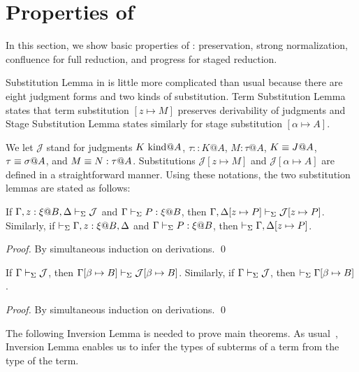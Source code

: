 
\section{Properties of \LMD \label{sec:properties}}

In this section, we show basic properties of \LMD: preservation, strong normalization, confluence for full reduction, and progress for staged reduction.


Substitution Lemma in \LMD{} is little more complicated than usual
because there are eight judgment forms and two kinds of substitution.
Term Substitution Lemma states that term substitution $[z \mapsto M]$
preserves derivability of judgments and Stage Substitution Lemma
states similarly for stage substitution $[\alpha\mapsto A]$.

We let $\mathcal{J}$ stand for judgments $K \text{\ kind} @A$, $\tau::K@A$,
$M:\tau@A$, $K \equiv J @ A$, $\tau \equiv \sigma @ A$, and
$M \equiv N : \tau @ A$.  Substitutions $\mathcal{J}[z \mapsto M]$ and
$\mathcal{J}[\alpha \mapsto A]$ are defined in a straightforward
manner.  Using these notations, the two substitution lemmas are stated as follows:

\begin{lemma}
  If $\G, z:\xi@B, \D \V \mathcal{J}$ and $\Gamma\vdash_\Sigma P:\xi @B$, then $\Gamma, \Delta[z \mapsto P] \vdash_\Sigma \mathcal{J}[z \mapsto P]$.  Similarly, if $\V \G, z:\xi@B, \D$ and
  $\Gamma\vdash_\Sigma P:\xi @B$, then $\vdash_\Sigma \Gamma, \Delta[z \mapsto P]$.
\end{lemma}

\begin{proof}
  By simultaneous induction on derivations.
 \qed
\end{proof}

\begin{lemma}
	If $\Gamma \vdash_\Sigma \mathcal{J}$, then $\Gamma[\beta\mapsto B] \vdash_\Sigma \mathcal{J}[\beta\mapsto B]$.  Similarly, if $\Gamma \vdash_\Sigma \mathcal{J}$, then $\vdash_\Sigma \Gamma[\beta\mapsto B]$.
\end{lemma}

\begin{proof}
  By simultaneous induction on derivations.
  \qed
\end{proof}


The following Inversion Lemma is needed to prove main theorems.
As usual~\cite{TAPL}, Inversion Lemma enables us to infer the types of subterms of a term from the type of the term.

